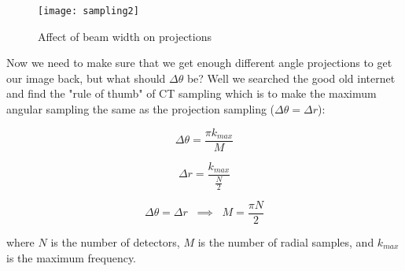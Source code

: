 \begin{figure}[h]
	\centering
	\texttt{[image: sampling2]}
	\caption{Affect of beam width on projections}
	\label{fig:ct:samp2}
\end{figure}

Now we need to make sure that we get enough different angle projections to get our image back, but what should $\Delta \theta$ be? Well we searched the good old internet and find the "rule of thumb" of CT sampling which is to make the maximum angular sampling the same as the projection sampling ($\Delta \theta = \Delta r$):

\begin{equation}
\Delta \theta = \frac{\pi k_{max}}{M}
\end{equation}

\begin{equation}
\Delta r = \frac{k_{max}}{\frac{N}{2}} 
\end{equation}

\begin{equation}
\Delta \theta = \Delta r \; \; \implies \; \; M = \frac{\pi N}{2}
\end{equation}

\noindent
where $N$ is the number of detectors, $M$ is the number of radial samples, and $k_{max}$ is the maximum frequency. 